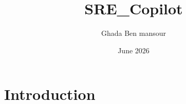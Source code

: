\documentclass{article}
\title{SRE\_Copilot}
\author{Ghada Ben mansour}
\date{June 2026}
\begin{document}
\maketitle

\section{Introduction}
\end{document}
